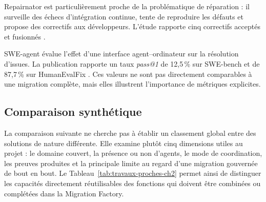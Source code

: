 Repairnator est particulièrement proche de la problématique de réparation : il surveille des échecs d'intégration continue, tente de reproduire les défauts et propose des correctifs aux développeurs. L'étude rapporte cinq correctifs acceptés et fusionnés \cite{repairnator}.

SWE-agent évalue l'effet d'une interface agent--ordinateur sur la résolution d'issues. La publication rapporte un taux \textit{pass@1} de 12,5\,\% sur SWE-bench et de 87,7\,\% sur HumanEvalFix \cite{swe-agent}. Ces valeurs ne sont pas directement comparables à une migration complète, mais elles illustrent l'importance de métriques explicites.

\subsection{Comparaison synthétique}

La comparaison suivante ne cherche pas à établir un classement global entre des solutions de nature différente. Elle examine plutôt cinq dimensions utiles au projet : le domaine couvert, la présence ou non d'agents, le mode de coordination, les preuves produites et la principale limite au regard d'une migration gouvernée de bout en bout. Le Tableau~\ref{tab:travaux-proches-ch2} permet ainsi de distinguer les capacités directement réutilisables des fonctions qui doivent être combinées ou complétées dans la Migration Factory.

